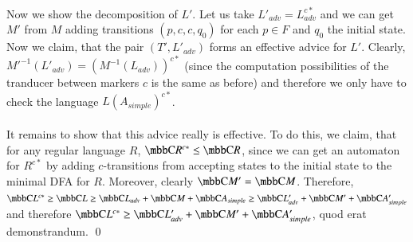 \paragraph{}
Now we show the decomposition of $L'$. Let us take $L'_{adv} = L_{adv}^{c*}$ and we can get $M'$ from $M$ adding transitions $(p, c, c, q_0)$ for each $p \in F$ and $q_0$ the initial state. Now we claim, that the pair $(T', L'_{adv})$ forms an effective advice for $L'$. Clearly, $M'^{-1}(L'_{adv}) = (M^{-1}(L_{adv}))^{c*}$ (since the computation possibilities of the tranducer between markers $c$ is the  same as before) and therefore we only have to check the language $L(A_{simple})^{c*}$.

\paragraph{}
It remains to show that this advice really is effective. To do this, we claim, that for any regular language $R$, $\C{R^{c*}} \leq \C{R}$, since we can get an automaton for $R^{c*}$ by adding $c$-transitions from accepting states to the initial state to the minimal DFA for $R$. Moreover, clearly $\C{M'} = \C{M}$. Therefore, $\C{L^{c*}} \geq \C{L} \geq \C{L_{adv}} + \C{M} + \C{A_{simple}} \geq \C{L'_{adv}} + \C{M'} + \C{A'_{simple}}$ and therefore $\C{L^{c*}} \geq \C{L'_{adv}} + \C{M'} + \C{A'_{simple}}$, quod erat demonstrandum. \qed
